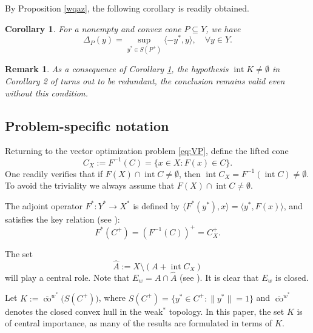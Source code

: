 \documentclass[10pt,a4paper]{amsart}
\DeclareMathOperator{\intr}{int}
\newtheorem{corollary}{Corollary}[section]
\newtheorem{remark}{Remark}[section]
\begin{document}
By Proposition \ref{wqaz}, the following corollary is readily obtained.
 \begin{corollary}\label{cor:Delta}
 	For a nonempty and  convex cone $P \subseteq Y$,  we have 
 $$
 		\Delta_P(y) = \sup_{y^* \in S(P^+)} \langle -y^*, y \rangle, \quad \forall y \in Y.
$$
 \end{corollary}


\begin{remark}   As a consequence of Corollary \ref{cor:Delta}, the hypothesis $\intr K \neq \emptyset$ in Corollary 2 of \cite{LiuNgYang2009} turns out to be redundant, the conclusion remains valid even without this condition.
  \end{remark}


 
 

\subsection{Problem-specific notation}

Returning to the vector optimization problem \eqref{eq:VP}, define the lifted cone
\[
C_X := F^{-1}(C) = \{x \in X : F(x) \in C\}.
\]
One readily verifies that if \( F(X) \cap \operatorname{int} C \neq \emptyset \), then \( \operatorname{int} C_X = F^{-1}(\operatorname{int} C) \neq \emptyset \).  
To avoid the triviality we always assume that $F(X) \cap \intr C \neq \emptyset$.



The adjoint operator $F^*: Y^* \to X^*$ is defined by $\langle F^*(y^*), x \rangle = \langle y^*, F(x) \rangle$, and satisfies the key relation (see \cite{Zalinescu1978}):
$$
	F^*(C^+) = (F^{-1}(C))^+ = C_X^+.
$$

The set
$$
	\widehat{A} := X \setminus (A + \intr C_X)
$$
will play a central role. Note that $E_w  = A \cap \widehat{A}$ (see \cite[Theorem 1]{LiuNgYang2009}).
It is clear that  $E_w $ is closed.

Let $K := \overline{\operatorname{co}}^{w^*}\big(S(C^+)\big)$,   where $S(C^+)=\{y^*\in C^+:\|y^*\|=1\}$  and ${\overline{\operatorname{co}}}^{w^*}$ denotes the closed convex hull in the weak$^*$ topology.
   In this paper, the set $K$ is of central importance, as many of the results are formulated in terms of $K$.
\end{document}
